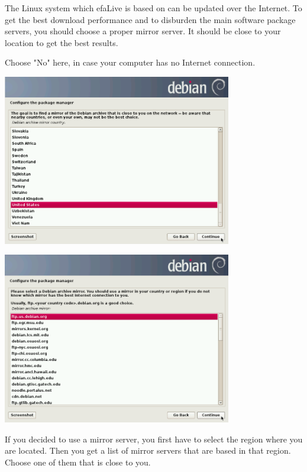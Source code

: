 \documentclass[a4paper,12pt,twoside]{article}
\begin{document}
The Linux system which efaLive is based on can be updated over the
Internet. To get the best download performance and to disburden the
main software package servers, you should choose a proper mirror
server. It should be close to your location to get the best results.

Choose "No" here, in case your computer has
no Internet connection.

\begin{minipage}{\linewidth}
    \centering
    \includegraphics[width=10cm]{efaLiveen-img/efaLiveen-img15.png}
    \label{fig:mirror_region}
\end{minipage}

\begin{minipage}{\linewidth}
    \centering
    \includegraphics[width=10cm]{efaLiveen-img/efaLiveen-img16.png}
    \label{fig:choose_mirror}
\end{minipage}

If you decided to use a mirror server, you first have to select the
region where you are located. Then you get a list of mirror servers
that are based in that region. Choose one of them that is close to you.
\end{document}
